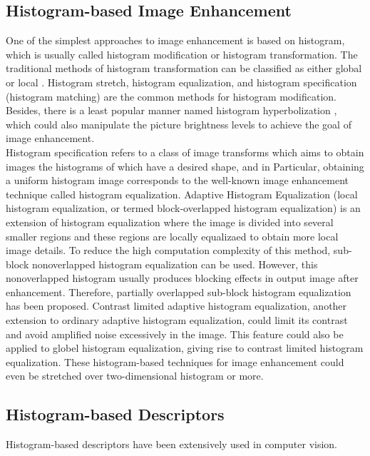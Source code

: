 \documentclass{article}
\begin{document}
\subsection{Histogram-based Image Enhancement}
One of the simplest approaches to image enhancement is based on histogram, which is usually called histogram modification or histogram transformation. The traditional methods of histogram transformation can be classified as either global\cite{Modification1978,Sapiro1997,Arici2009} or local \cite{Caselles1999}. Histogram stretch\cite{Alparslan1981}, histogram equalization\cite{Kundu1998}, and histogram specification (histogram matching)\cite{Coltuc2006,Wan2007,Mignotte2011,Sen2011} are the common methods for histogram modification. Besides, there is a least popular manner named histogram hyperbolization \cite{Nahin1979}, which could also manipulate the picture brightness levels to achieve the goal of image enhancement.\\
Histogram specification refers to a class of image transforms which aims to obtain images the histograms of which have a desired shape, and in Particular, obtaining a uniform histogram image corresponds to the well-known image enhancement technique called histogram equalization. Adaptive Histogram Equalization (local histogram equalization, or termed block-overlapped histogram equalization) is an extension of histogram equalization where the image is divided into several smaller regions and these regions are locally equalizaed to obtain more local image details. To reduce the high computation complexity of this method, sub-block nonoverlapped histogram equalization can be used. However, this nonoverlapped histogram usually produces blocking effects in output image after enhancement. Therefore, partially overlapped sub-block histogram equalization has been proposed\cite{Kim2001}. Contrast limited adaptive histogram equalization,	another extension to ordinary adaptive histogram equalization,  could limit its contrast and avoid amplified noise excessively in the image\cite{Zhu1999}. This feature could also be applied to globel histogram equalization, giving rise to contrast limited histogram equalization. These histogram-based techniques for image enhancement could even be stretched over two-dimensional histogram or more\cite{Celik2012}.
\subsection{Histogram-based Descriptors}
Histogram-based descriptors have been extensively used in computer vision.
\end{document}
